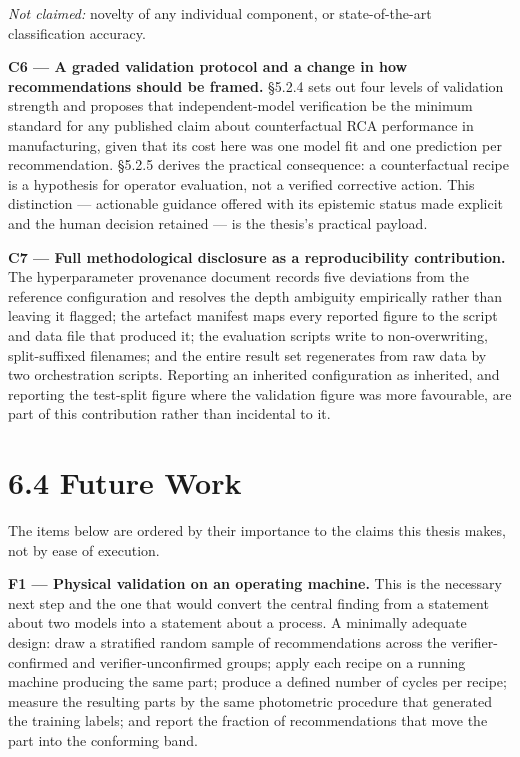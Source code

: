\emph{Not claimed:} novelty of any individual component, or state-of-the-art classification accuracy.

\textbf{C6 --- A graded validation protocol and a change in how recommendations should be framed.} §5.2.4 sets out four levels of validation strength and proposes that independent-model verification be the minimum standard for any published claim about counterfactual RCA performance in manufacturing, given that its cost here was one model fit and one prediction per recommendation. §5.2.5 derives the practical consequence: a counterfactual recipe is a hypothesis for operator evaluation, not a verified corrective action. This distinction --- actionable guidance offered with its epistemic status made explicit and the human decision retained --- is the thesis's practical payload.

\textbf{C7 --- Full methodological disclosure as a reproducibility contribution.} The hyperparameter provenance document records five deviations from the reference configuration and resolves the depth ambiguity empirically rather than leaving it flagged; the artefact manifest maps every reported figure to the script and data file that produced it; the evaluation scripts write to non-overwriting, split-suffixed filenames; and the entire result set regenerates from raw data by two orchestration scripts. Reporting an inherited configuration as inherited, and reporting the test-split figure where the validation figure was more favourable, are part of this contribution rather than incidental to it.

\hypertarget{future-work}{%
\section{6.4 Future Work}\label{future-work}}

The items below are ordered by their importance to the claims this thesis makes, not by ease of execution.

\textbf{F1 --- Physical validation on an operating machine.} This is the necessary next step and the one that would convert the central finding from a statement about two models into a statement about a process. A minimally adequate design: draw a stratified random sample of recommendations across the verifier-confirmed and verifier-unconfirmed groups; apply each recipe on a running machine producing the same part; produce a defined number of cycles per recipe; measure the resulting parts by the same photometric procedure that generated the training labels; and report the fraction of recommendations that move the part into the conforming band.

